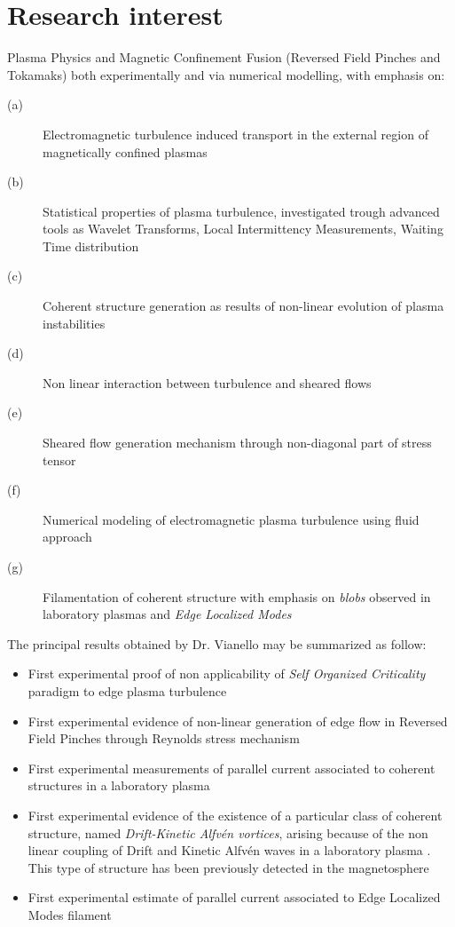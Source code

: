 \section{Research interest}
Plasma Physics and Magnetic Confinement Fusion (Reversed Field
Pinches and Tokamaks) both experimentally and via numerical modelling,
with emphasis on:
\begin{description}
\item[(a)] Electromagnetic turbulence induced transport in the
  external region of magnetically confined plasmas
\item[(b)] Statistical properties of plasma turbulence, investigated
  trough advanced tools as Wavelet Transforms, Local Intermittency
  Measurements, Waiting Time distribution
\item[(c)] Coherent structure generation as results of non-linear
  evolution of plasma instabilities
\item[(d)] Non linear interaction between turbulence and sheared flows
\item[(e)] Sheared flow generation mechanism through non-diagonal part
  of stress tensor
\item[(f)] Numerical modeling of electromagnetic plasma turbulence
  using fluid approach
\item[(g)] Filamentation of coherent structure with emphasis on
  \emph{blobs} observed in laboratory plasmas and \emph{Edge Localized
  Modes}
\end{description}
The principal results obtained by Dr. Vianello may be summarized as
follow:
\begin{itemize}
\item First experimental proof of non applicability of \emph{Self
    Organized Criticality} paradigm to edge plasma turbulence \cite{Spada:2001p3574,Antoni:2001p3221}
\item First experimental evidence of non-linear generation of edge
  flow in Reversed Field Pinches through Reynolds stress mechanism \cite{Vianello:2005p1976,Vianello:2005p2671}
\item First experimental measurements of parallel current associated
  to coherent structures in a laboratory plasma \cite{Spolaore:2009p4115}
\item First experimental evidence of the existence of a particular
  class of coherent structure, named \emph{Drift-Kinetic Alfv\'en
    vortices}, arising because of the non linear coupling of Drift and
  Kinetic Alfv\'en waves in a laboratory plasma \cite{Vianello:2010p4670}. This type of structure has been
  previously detected in the magnetosphere
\item First experimental estimate of parallel current associated to
  Edge Localized Modes filament \cite{vianello:elm}
\end{itemize}
